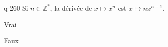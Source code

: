 \begin{truefalse}{q-260}
Si $n \in \mathbb Z^*$, la dérivée de $x\mapsto x^n$ est $x\mapsto nx^{n-1}$.
\item* Vrai
\item Faux
\end{truefalse}

